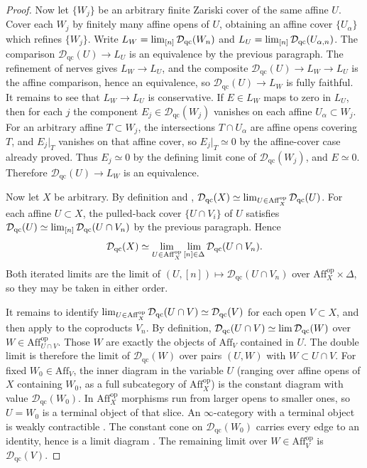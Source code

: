 \documentclass[11pt]{amsart}
\newcommand{\op}{{\operatorname{op}}}
\renewcommand{\lim}{\operatornamewithlimits{\rm{lim}}}
\newcommand{\Aff}{\mathrm{Aff}}
\newcommand{\Dqc}{\mathcal D_{\mathrm{qc}}}
\theoremstyle{plain}
\theoremstyle{definition}
\numberwithin{equation}{section}
\begin{document}
\begin{proof}
Now let $\{W_j\}$ be an arbitrary finite Zariski cover of the same affine $U$.
Cover each $W_j$ by finitely many affine opens of $U$, obtaining an affine cover $\{U_\alpha\}$ which refines $\{W_j\}$.
Write $L_W=\lim_{[n]}\Dqc(W_n)$ and $L_U=\lim_{[n]}\Dqc(U_{\alpha,n})$.
The comparison $\Dqc(U)\to L_U$ is an equivalence by the previous paragraph.
The refinement of nerves gives $L_W\to L_U$, and the composite $\Dqc(U)\to L_W\to L_U$ is the affine comparison, hence an equivalence, so $\Dqc(U)\to L_W$ is fully faithful.
It remains to see that $L_W\to L_U$ is conservative.
If $E\in L_W$ maps to zero in $L_U$, then for each $j$ the component $E_j\in\Dqc(W_j)$ vanishes on each affine $U_\alpha\subset W_j$.
For an arbitrary affine $T\subset W_j$, the intersections $T\cap U_\alpha$ are affine opens covering $T$, and $E_j|_T$ vanishes on that affine cover, so $E_j|_T\simeq0$ by the affine-cover case already proved.
Thus $E_j\simeq0$ by the defining limit cone of $\Dqc(W_j)$, and $E\simeq0$.
Therefore $\Dqc(U)\to L_W$ is an equivalence.

Now let $X$ be arbitrary.
By definition and , $\Dqc(X)\simeq\lim_{U\in\Aff_X^{\op}}\Dqc(U)$.
For each affine $U\subset X$, the pulled-back cover $\{U\cap V_i\}$ of $U$ satisfies $\Dqc(U)\simeq\lim_{[n]}\Dqc(U\cap V_n)$ by the previous paragraph.
Hence
\[
 \Dqc(X)\simeq\lim_{U\in\Aff_X^{\op}}\lim_{[n]\in\Delta}\Dqc(U\cap V_n).
\]
Both iterated limits are the limit of $(U,[n])\mapsto\Dqc(U\cap V_n)$ over $\Aff_X^{\op}\times\Delta$, so they may be taken in either order.

It remains to identify $\lim_{U\in\Aff_X^{\op}}\Dqc(U\cap V)\simeq\Dqc(V)$ for each open $V\subset X$, and then apply  to the coproducts $V_n$.
By definition, $\Dqc(U\cap V)\simeq\lim \Dqc(W)$ over $W\in\Aff_{U\cap V}^{\op}$.
Those $W$ are exactly the objects of $\Aff_V$ contained in $U$.
The double limit is therefore the limit of $\Dqc(W)$ over pairs $(U,W)$ with $W\subset U\cap V$.
For fixed $W_0\in\Aff_V$, the inner diagram in the variable $U$ (ranging over affine opens of $X$ containing $W_0$, as a full subcategory of $\Aff_X^{\op}$) is the constant diagram with value $\Dqc(W_0)$.
In $\Aff_X^{\op}$ morphisms run from larger opens to smaller ones, so $U=W_0$ is a terminal object of that slice.
An $\infty$-category with a terminal object is weakly contractible \cite[\href{https://kerodon.net/tag/02P2}{Tag 02P2}]{Kerodon}.
The constant cone on $\Dqc(W_0)$ carries every edge to an identity, hence is a limit diagram \cite[\href{https://kerodon.net/tag/02XX}{Tag 02XX}]{Kerodon}.
The remaining limit over $W\in\Aff_V^{\op}$ is $\Dqc(V)$.
\end{proof}
\end{document}
